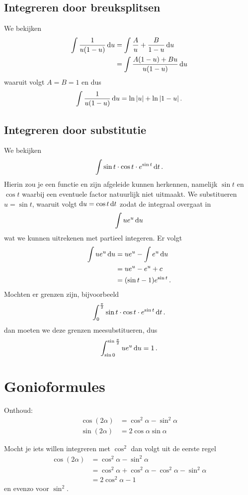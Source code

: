 \documentclass{article}
\begin{document}
        \subsection{Integreren door breuksplitsen}
            We bekijken
            \begin{align*}
                \int \frac{1}{u(1-u)} \mathop{}\!\mathrm{d} u &= \int \frac{A}{u} + \frac{B}{1-u} \mathop{}\!\mathrm{d} u \\
                &= \int \frac{A(1-u)+Bu}{u(1-u)} \mathop{}\!\mathrm{d} u
            \end{align*}
            waaruit volgt $A=B=1$ en dus
            \[ \int \frac{1}{u(1-u)} \mathop{}\!\mathrm{d} u = \ln |u| + \ln |1-u|\,. \]
        \subsection{Integreren door substitutie}
            We bekijken
            \[ \int \sin t \cdot \cos t \cdot e^{\sin t} \mathop{}\!\mathrm{d} t\,. \]
            Hierin zou je een functie en zijn afgeleide kunnen herkennen, namelijk
            $\sin t$ en $\cos t$ waarbij een eventuele factor natuurlijk niet uitmaakt.
            We substitueren $u = \sin t$, waaruit volgt $\mathop{}\!\mathrm{d} u = \cos t \mathop{}\!\mathrm{d} t$
            zodat de integraal overgaat in
            \[ \int u e^u \mathop{}\!\mathrm{d} u \]
            wat we kunnen uitrekenen met partieel integeren. Er volgt
            \begin{align*}
                \int u e^u \mathop{}\!\mathrm{d} u &= u e^u - \int e^u \mathop{}\!\mathrm{d} u \\
                &=  u e^u -  e^u + c \\
                &= (\sin t -1) e^{\sin t} \,.
            \end{align*}
            Mochten er grenzen zijn, bijvoorbeeld
            \[ \int_0^{\frac{\pi}{2}} \sin t \cdot \cos t \cdot e^{\sin t} \mathop{}\!\mathrm{d} t\,. \]
            dan moeten we deze grenzen meesubstitueren, dus
            \[ \int_{\sin 0}^{\sin \frac{\pi}{2}} u e^u \mathop{}\!\mathrm{d} u = 1\,. \]

	 \section{Gonioformules}
		 Onthoud:
 		 \begin{align*}
 			 \cos (2\alpha) &= \cos^2 \alpha - \sin^2 \alpha \\
 			 \sin (2\alpha) &= 2 \cos \alpha \sin \alpha
 		 \end{align*}
 		 
 		 Mocht je iets willen integreren met $\cos^2$ dan volgt uit de eerste regel
 		 \begin{align*}
 		 		 \cos (2\alpha) &= \cos^2 \alpha - \sin^2 \alpha \\
 		 		 &=  \cos^2 \alpha + \cos^2 \alpha - \cos^2 \alpha - \sin^2 \alpha \\
 		 		 &= 2\cos^2 \alpha -1
 		 	 \end{align*}
 		 	 en evenzo voor $\sin^2$.
\end{document}
